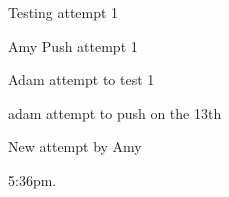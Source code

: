 Testing attempt 1


Amy Push attempt 1

Adam attempt to test 1

adam attempt to push on the 13th


New attempt by Amy

5:36pm.
